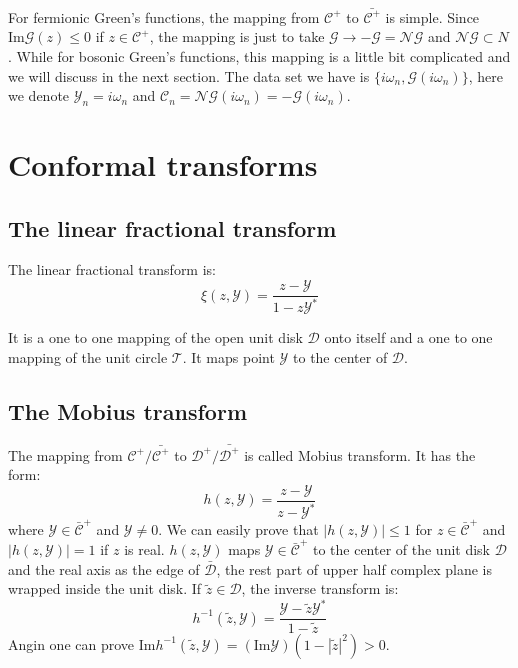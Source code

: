 \documentclass[
	preprint,%
	aps,
	prb,
	showpacs,	
	amsmath, amssymb]{revtex4-2}
\DeclareRobustCommand{\+}{\hstretch{1.25} {\boldsymbol {\mathrel{+}}}}
\newcommand{\im}{ {\mathrm{Im}} }
\newcommand{\Y}{ {\mathcal{Y}} }
\newcommand{\C}{ {\mathcal{C}} }
\newcommand{\Cbar}{ {\bar{\mathcal{C}}} }
\newcommand{\D}{ {\mathcal{D}} }
\newcommand{\Dbar}{ {\bar{\mathcal{D}}} }
\begin{document}
For fermionic Green's functions, the mapping from $\C^+$ to 
$\bar{\C^+}$ is simple. Since $\im \mathcal{G}(z) \leq 0$ if 
$z \in \C^+$, the mapping is just to take 
$\mathcal{G} \to -\mathcal{G} = \mathcal{NG}$ and $\mathcal{NG} \subset N$. While for 
bosonic Green's functions, this mapping is a little bit complicated and 
we will discuss in the next section. The data set we have is 
$\{i\omega_n, \mathcal{G}(i\omega_n)\}$, here we denote $\Y_n = i\omega_n$ 
and $\C_n = \mathcal{NG}(i\omega_n) = -\mathcal{G}(i\omega_n)$. 





\appendix
\section{Conformal transforms}
\label{app:conformal-transforms}

\subsection{The linear fractional transform}
\label{appsub:linear-fractional-transform}
The linear fractional transform is:
\begin{equation}\label{eq:linear-fractional-transform}
	\xi(z, \Y) = \frac{z - \Y}{1 - z\Y^*}
\end{equation}

It is a one to one mapping of the open unit disk $\D$ onto 
itself and a one to one mapping of the unit circle $\mathcal{T}$.
It maps point $\Y$ to the center of $\D$.


\subsection{The Mobius transform}
\label{appsub:mobius-transform}
The mapping from $\C^+/\bar{\C^+}$ to 
$\D^+/\bar{\D^+}$ is called Mobius transform.
It has the form:
\begin{equation}\label{eq:def-mobius-transform}
	h(z, \Y)  = \frac{z - \Y}{z - \Y^*}
\end{equation}
where $\Y \in \Cbar^+$ and $\Y \neq 0$. We can easily prove that 
$|h(z, \Y)| \leq 1$ for $z \in \Cbar^+$ and
$|h(z, \Y)| = 1$ if $z$ is real. $h(z, \Y)$ maps $\Y \in \Cbar^+$
to the center of the unit disk $\D$ and the real axis as the 
edge of $\Dbar$, the rest part of upper half complex plane is 
wrapped inside the unit disk. If $ \tilde{z} \in \D$, the inverse 
transform is:
\begin{equation}\label{eq:def-inv-mobius-transform}
	h^{-1}(\tilde{z}, \Y) = \frac{\Y - \tilde{z}\Y^*}{1 - \tilde{z}}
\end{equation}
Angin one can prove 
$\im h^{-1}(\tilde{z}, \Y) = (\im\Y)(1 - |\tilde{z}|^2 ) > 0$.
\end{document}
